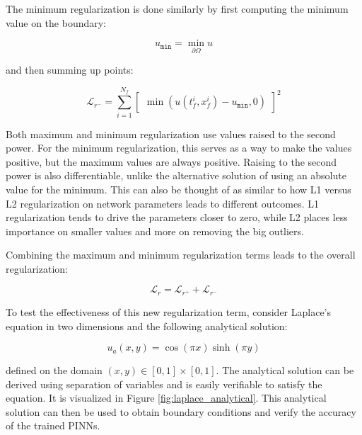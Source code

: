 The minimum regularization is done similarly by first computing the minimum value on the boundary:

\begin{equation}
    u_{\texttt{min}} = \min_{\partial \Omega} u
\end{equation}

\noindent and then summing up points:

\begin{equation}
    \mathcal{L}_{r^-} = \sum_{i=1}^{N_f} \begin{bmatrix} \min(u(t_f^i, x_f^i) - u_{\texttt{min}}, 0) \end{bmatrix}^2
\end{equation}

Both maximum and minimum regularization use values raised to the second power. For the minimum regularization, this serves as a way to make the values positive, but the maximum values are always positive. Raising to the second power is also differentiable, unlike the alternative solution of using an absolute value for the minimum. This can also be thought of as similar to how L1 versus L2 regularization on network parameters leads to different outcomes. L1 regularization tends to drive the parameters closer to zero, while L2 places less importance on smaller values and more on removing the big outliers.

Combining the maximum and minimum regularization terms leads to the overall regularization:

\begin{equation}
    \mathcal{L}_r = \mathcal{L}_{r^+} + \mathcal{L}_{r^-}
    \label{eq:maxminreg}
\end{equation}

To test the effectiveness of this new regularization term, consider Laplace's equation in two dimensions and the following analytical solution:

\begin{equation}
    u_a(x, y) = \cos(\pi x) \sinh (\pi y)
\end{equation}

\noindent defined on the domain $(x, y) \in [0, 1] \times [0, 1]$. The analytical solution can be derived using separation of variables and is easily verifiable to satisfy the equation. It is visualized in Figure \ref{fig:laplace_analytical}. This analytical solution can then be used to obtain boundary conditions and verify the accuracy of the trained PINNs.

